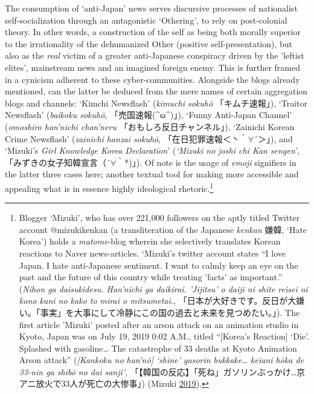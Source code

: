 \documentclass[10pt,british,A4paper,oneside]{memoir}
\begin{document}
The consumption of `anti-Japan' news serves discursive processes of
nationalist self-socialization through an antagonistic `Othering', to
rely on post-colonial theory. In other words, a construction of the self
as being both morally superior to the irrationality of the dehumanized
Other (positive self-presentation), but also as the \emph{real} victim
of a greater anti-Japanese conspiracy driven by the 'leftist elites', mainstream news and an imagined foreign enemy. This is
further framed in a cynicism adherent to these cyber-communities.
Alongside the blogs already mentioned, can the latter be deduced from
the mere names of certain aggregation blogs and channels: `Kimchi
Newsflash' (\emph{kimuchi sokuhō} 「キムチ速報」), `Traitor Newsflash'
(\emph{baikoku sokuhō}, 「売国速報(\^{}ω\^{})」), `Funny Anti-Japan
Channel' (\emph{omoshiro han'nichi chan'neru}
「おもしろ反日チャンネル」), `Zainichi Korean Crime Newsflash'
(\emph{zainichi hanzai sokuhō}, 「在日犯罪速報＜丶｀\(\forall\)´＞」),
and `Mizuki's \emph{Girl Knowledge Korea Declaration}' (\emph{`Mizuki no
joshi chi Kan sengen'}, 「みずきの女子知韓宣言（´\(\forall\)｀*)」). Of
note is the usage of \emph{emoji} signifiers in the latter three cases
here; another textual tool for making more accessible and appealing what
is in essence highly ideological rhetoric.\footnote{Blogger `Mizuki',
  who has over 221,000 followers on the aptly titled Twitter account
  @mizukikenkan (a transliteration of the Japanese \emph{kenkan} 嫌韓,
  `Hate Korea') holds a \emph{matome}-blog wherein she selectively
  translates Korean reactions to Naver news-articles. `Mizuki's twitter
  account states ``I love Japan. I hate anti-Japanese sentiment. I want
  to calmly keep an eye on the past and the future of this country while
  treating 'facts' as important.'' (\emph{Nihon ga daisukidesu.
  Han'nichi ga daikirai. 'Jijitsu' o daiji ni shite reisei ni kono kuni
  no kako to mirai o mitsumetai.},
  「日本が大好きです。反日が大嫌い。「事実」を大事にして冷静にこの国の過去と未来を見つめたい。」).
  The first article 'Mizuki' posted after an arson attack on an
  animation studio in Kyoto, Japan was on July 19, 2019 0:02 A.M.,
  titled ``{[}Korea's Reaction{]} `Die'. Splashed with gasoline\ldots{}
  The catastrophe of 33 deaths at Kyoto Animation Arson attack''
  (\emph{{[}Kankoku no han'nō{]} `shine' gasorin bukkake\ldots{} keiani
  hōka de 33-nin ga shibō no dai sanji'},
  「【韓国の反応】「死ね」ガソリンぶっかけ\ldots{}京アニ放火で33人が死亡の大惨事」)
  (Mizuki \protect\hyperlink{ref-mizuki_eng._2019}{2019}).}
\end{document}
